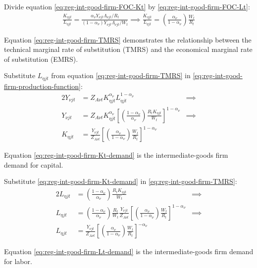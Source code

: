 \documentclass[
thesis.tex
]{subfiles}
\begin{document}
Divide equation \ref{eq:reg-int-good-firm-FOC-Kt} by \ref{eq:reg-int-good-firm-FOC-Lt}:
\begin{align}
	\frac{K_{\eta jt}}{L_{\eta jt}} = \frac{{\alpha_\nu} Y_{\nu jt} \Lambda_{\nu jt} /R_t}{(1-{\alpha_\nu}) Y_{\nu jt} \Lambda_{\nu jt} /W_t} \implies
	\frac{K_{\eta jt}}{L_{\eta jt}} = \left( \frac{{\alpha_\nu}}{1-{\alpha_\nu}} \right) \frac{W_t}{R_t} \label{eq:reg-int-good-firm-TMRS}
\end{align}

Equation \ref{eq:reg-int-good-firm-TMRS} demonstrates the relationship between the technical marginal rate of substitution (TMRS) and the economical marginal rate of substitution (EMRS). 

Substitute $L_{\eta jt}$ from equation \ref{eq:reg-int-good-firm-TMRS} in \ref{eq:reg-int-good-firm-production-function}:
\begin{alignat}{2}
	Y_{\nu jt} & = Z_{A\nu t} K_{\eta jt}^{\alpha_\nu} L_{\eta jt}^{1-{\alpha_\nu}} &\implies \nonumber \\
	Y_{\nu jt} & = Z_{A\nu t} K_{\eta jt}^{\alpha_\nu} \left[ \left( \frac{1-{\alpha_\nu}}{{\alpha_\nu}} \right) \frac{R_t K_{\eta jt}}{W_t} \right]^{1-{\alpha_\nu}} &\implies \nonumber \\
	K_{\eta jt} & = \frac{Y_{\nu jt}}{Z_{A\nu t}} \left[ \left( \frac{{\alpha_\nu}}{1-{\alpha_\nu}} \right) \frac{W_t}{R_t}\right]^{1-{\alpha_\nu}} \label{eq:reg-int-good-firm-Kt-demand}
\end{alignat}

Equation \ref{eq:reg-int-good-firm-Kt-demand} is the intermediate-goods firm demand for capital. 

Substitute \ref{eq:reg-int-good-firm-Kt-demand} in \ref{eq:reg-int-good-firm-TMRS}:
\begin{alignat}{2}
	L_{\eta jt} & = \left( \frac{1-{\alpha_\nu}}{{\alpha_\nu}} \right) \frac{R_t K_{\eta jt}}{W_t} &\implies \nonumber \\
	L_{\eta jt} & = \left( \frac{1-{\alpha_\nu}}{{\alpha_\nu}} \right) \frac{R_t}{W_t} \frac{Y_{\nu jt}}{Z_{A\nu t}} \left[ \left( \frac{{\alpha_\nu}}{1-{\alpha_\nu}} \right) \frac{W_t}{R_t}\right]^{1-{\alpha_\nu}} &\implies \nonumber \\
	L_{\eta jt} & = \frac{Y_{\nu jt}}{Z_{A\nu t}} \left[ \left( \frac{{\alpha_\nu}}{1-{\alpha_\nu}} \right) \frac{W_t}{R_t}\right]^{-{\alpha_\nu}} \label{eq:reg-int-good-firm-Lt-demand}
\end{alignat}

Equation \ref{eq:reg-int-good-firm-Lt-demand} is the intermediate-goods firm demand for labor.
\end{document}
